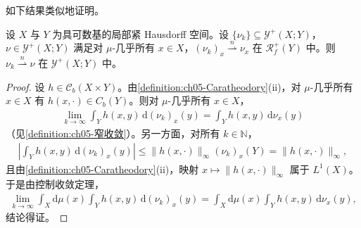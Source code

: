 \documentclass[../../main.tex]{subfiles}%
\begin{document}
如下结果类似地证明。

\begin{proposition}\label{proposition:ch05-逐点窄收敛}
设 $X$ 与 $Y$ 为具可数基的局部紧 Hausdorff 空间。设 $\{\nu_k\}\subseteq\mathcal{Y}^+(X;Y)$，$\nu\in\mathcal{Y}^+(X;Y)$ 满足对 $\mu$-几乎所有 $x\in X$，$(\nu_k)_x\stackrel{n}{\rightharpoonup}\nu_x$ 在 $\mathscr{R}^+_f(Y)$ 中。则 $\nu_k\stackrel{n}{\rightharpoonup}\nu$ 在 $\mathcal{Y}^+(X;Y)$ 中。
\end{proposition}

\begin{proof}
设 $h\in\mathcal{C}_b(X\times Y)$。由\cref{definition:ch05-Caratheodory}(ii)，对 $\mu$-几乎所有 $x\in X$ 有 $h(x,\cdot)\in C_b(Y)$。则对 $\mu$-几乎所有 $x\in X$，
\begin{align*}
\lim_{k\to\infty}\int_Y h(x,y)\,\mathrm{d}(\nu_k)_x(y)
=\int_Y h(x,y)\,\mathrm{d}\nu_x(y)
\end{align*}
（见\cref{definition:ch05-窄收敛}）。另一方面，对所有 $k\in\mathbb{N}$，
\begin{align*}
\left|\int_Y h(x,y)\,\mathrm{d}(\nu_k)_x(y)\right|
\leqslant\|h(x,\cdot)\|_\infty(\nu_k)_x(Y)=\|h(x,\cdot)\|_\infty,
\end{align*}
且由\cref{definition:ch05-Caratheodory}(ii)，映射 $x\mapsto\|h(x,\cdot)\|_\infty$ 属于 $L^1(X)$。于是由控制收敛定理，
\begin{align*}
\lim_{k\to\infty}\int_X\mathrm{d}\mu(x)\int_Y h(x,y)\,\mathrm{d}(\nu_k)_x(y)
=\int_X\mathrm{d}\mu(x)\int_Y h(x,y)\,\mathrm{d}\nu_x(y),
\end{align*}
结论得证。
\end{proof}
\end{document}
